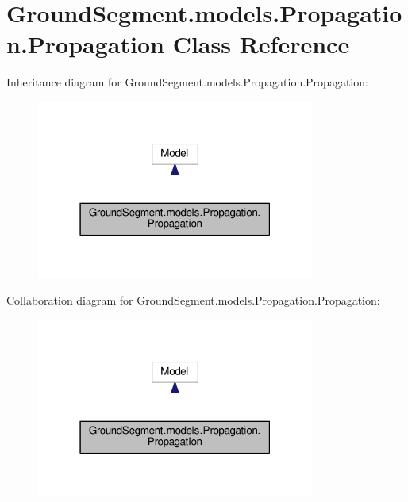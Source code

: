 \hypertarget{class_ground_segment_1_1models_1_1_propagation_1_1_propagation}{}\section{Ground\+Segment.\+models.\+Propagation.\+Propagation Class Reference}
\label{class_ground_segment_1_1models_1_1_propagation_1_1_propagation}


Inheritance diagram for Ground\+Segment.\+models.\+Propagation.\+Propagation\+:\nopagebreak
\begin{figure}[H]
\begin{center}
\leavevmode
\includegraphics[width=259pt]{class_ground_segment_1_1models_1_1_propagation_1_1_propagation__inherit__graph}
\end{center}
\end{figure}


Collaboration diagram for Ground\+Segment.\+models.\+Propagation.\+Propagation\+:\nopagebreak
\begin{figure}[H]
\begin{center}
\leavevmode
\includegraphics[width=259pt]{class_ground_segment_1_1models_1_1_propagation_1_1_propagation__coll__graph}
\end{center}
\end{figure}
